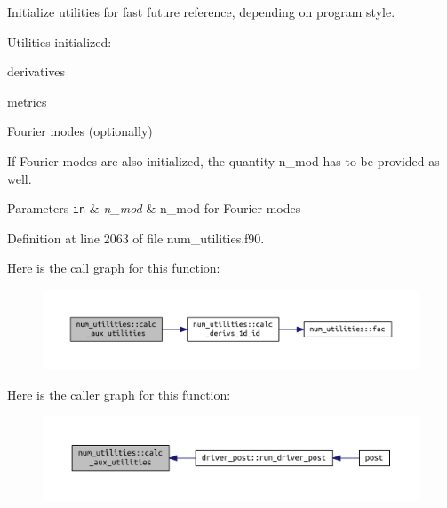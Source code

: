 Initialize utilities for fast future reference, depending on program style. 

Utilities initialized\+:
\begin{DoxyItemize}
\item derivatives
\item metrics
\item Fourier modes (optionally)
\end{DoxyItemize}

If Fourier modes are also initialized, the quantity {\ttfamily n\+\_\+mod} has to be provided as well.


\begin{DoxyParams}[1]{Parameters}
\mbox{\tt in}  & {\em n\+\_\+mod} & n\+\_\+mod for Fourier modes \\
\hline
\end{DoxyParams}


Definition at line 2063 of file num\+\_\+utilities.\+f90.

Here is the call graph for this function\+:\nopagebreak
\begin{figure}[H]
\begin{center}
\leavevmode
\includegraphics[width=350pt]{namespacenum__utilities_af461ae4c95a7a45da875dcf311e323f5_cgraph}
\end{center}
\end{figure}
Here is the caller graph for this function\+:\nopagebreak
\begin{figure}[H]
\begin{center}
\leavevmode
\includegraphics[width=350pt]{namespacenum__utilities_af461ae4c95a7a45da875dcf311e323f5_icgraph}
\end{center}
\end{figure}
\mbox{\label{namespacenum__utilities_a4dffe3beba7165dd17cff19a99a9e2ac}} 
